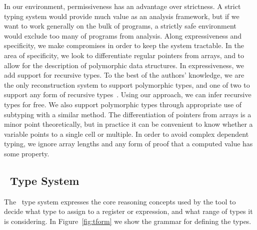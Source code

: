 In our environment, permissiveness has an advantage over strictness. A strict typing system would provide much value as an analysis framework, but if we want to work generally on the bulk of programs, a strictly safe environment would exclude too many of programs from analysis. Along expressiveness and specificity, we make compromises in order to keep the system tractable. In the area of specificity, we look to differentiate regular pointers from arrays, and to allow for the description of polymorphic data structures. In expressiveness, we add support for recursive types. To the best of the authors' knowledge, we are the only reconstruction system to support polymorphic types, and one of two to support any form of recursive types~\cite{sw}.
Using our approach, we can infer recursive types for free. We also support polymorphic types through appropriate use of subtyping with a similar method.
The differentiation of pointers from arrays is a minor point theoretically, but in practice it can be convenient to know whether a variable points to a single cell or multiple.
In order to avoid complex dependent typing, we ignore array lengths and any form of proof that a computed value has some property.

\subsection{\bitr\ Type System}
\label{subsec:typesys}
The \bitr\ type system expresses the core reasoning concepts used by the tool to decide what type to assign to a register or expression, and what range of types it is considering. In Figure~\ref{fig:tform} we show the grammar for defining the types.

